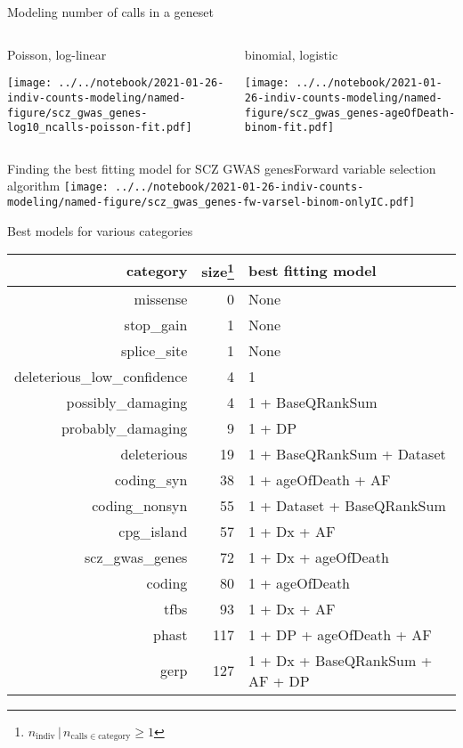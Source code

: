 \documentclass[usenames,dvipsnames]{beamer}
\begin{document}
\begin{frame}{Modeling number of calls in a geneset}
\begin{columns}[t]
\begin{column}{0.5\textwidth}
\begin{center}
Poisson, log-linear
\end{center}
\texttt{[image: ../../notebook/2021-01-26-indiv-counts-modeling/named-figure/scz\_gwas\_genes-log10\_ncalls-poisson-fit.pdf]}
\end{column}

\begin{column}{0.5\textwidth}
\begin{center}
binomial, logistic
\end{center}
\texttt{[image: ../../notebook/2021-01-26-indiv-counts-modeling/named-figure/scz\_gwas\_genes-ageOfDeath-binom-fit.pdf]}
\end{column}
\end{columns}
\begin{center}
\end{center}
\end{frame}

\begin{frame}{Finding the best fitting model for SCZ GWAS genes}{Forward variable selection algorithm}
\texttt{[image: ../../notebook/2021-01-26-indiv-counts-modeling/named-figure/scz\_gwas\_genes-fw-varsel-binom-onlyIC.pdf]}
\end{frame}

\begin{frame}{Best models for various categories}
\begin{center}
\tiny
\begin{tabular}{rrl}
\hline
category  & size\footnote{\(n_\mathrm{indiv} \,|\, n_{\mathrm{calls} \in
			\mathrm{category}} \ge 1\)} & best fitting model  \\
\hline
missense  & 0 & None  \\
stop\_gain  & 1 & None  \\
splice\_site  & 1 & None  \\
deleterious\_low\_confidence  & 4 & 1 \\
possibly\_damaging  & 4 & 1 + BaseQRankSum  \\
probably\_damaging  & 9 & 1 + DP  \\
deleterious  & 19 & 1 + BaseQRankSum + Dataset  \\
coding\_syn  & 38 & 1 + ageOfDeath + AF  \\
coding\_nonsyn  & 55 & 1 + Dataset + BaseQRankSum  \\
cpg\_island  & 57 & 1 + Dx + AF  \\
scz\_gwas\_genes  & 72 & 1 + Dx + ageOfDeath  \\
coding  & 80 & 1 + ageOfDeath  \\
tfbs  & 93 & 1 + Dx + AF  \\
phast  & 117 & 1 + DP + ageOfDeath + AF  \\
gerp  & 127 & 1 + Dx + BaseQRankSum + AF + DP  \\
\hline
\end{tabular}
\end{center}
\end{frame}
\end{document}
